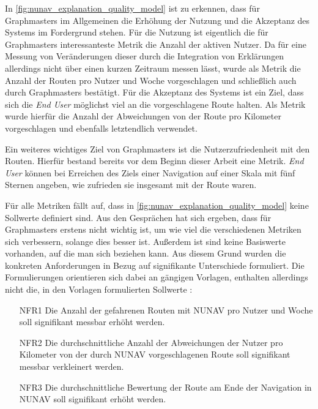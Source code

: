 In \autoref{fig:nunav_explanation_quality_model} ist zu erkennen, dass für Graphmasters im Allgemeinen die Erhöhung der Nutzung und die Akzeptanz des Systems im Fordergrund stehen. Für die Nutzung ist eigentlich die für Graphmasters interessanteste Metrik die Anzahl der aktiven Nutzer. Da für eine Messung von Veränderungen dieser durch die Integration von Erklärungen allerdings nicht über einen kurzen Zeitraum messen lässt, wurde  als Metrik die Anzahl der Routen pro Nutzer und Woche vorgeschlagen und schließlich auch durch Graphmasters bestätigt. Für die Akzeptanz des Systems ist ein Ziel, dass sich die \textit{End User} möglichst viel an die vorgeschlagene Route halten. Als Metrik wurde hierfür die Anzahl der Abweichungen von der Route pro Kilometer vorgeschlagen und ebenfalls letztendlich verwendet.

Ein weiteres wichtiges Ziel von Graphmasters ist die Nutzerzufriedenheit mit den Routen. Hierfür bestand bereits vor dem Beginn dieser Arbeit eine Metrik. \textit{End User} können bei Erreichen des Ziels einer Navigation auf einer Skala mit fünf Sternen angeben, wie zufrieden sie insgesamt mit der Route waren.

Für alle Metriken fällt auf, dass in \autoref{fig:nunav_explanation_quality_model} keine Sollwerte definiert sind. Aus den Gesprächen hat sich ergeben, dass für Graphmasters erstens nicht wichtig ist, um wie viel die verschiedenen Metriken sich verbessern, solange dies besser ist. Außerdem ist sind keine Basiswerte vorhanden, auf die man sich beziehen kann. Aus diesem Grund wurden die konkreten Anforderungen in Bezug auf signifikante Unterschiede formuliert. Die Formulierungen orientieren sich dabei an gängigen Vorlagen, enthalten allerdings nicht die, in den Vorlagen formulierten Sollwerte \cite{rajnish2010quality, wiegers1999writing, alexander2002writing}:

\begin{enumerate}
    \item [NFR1] Die Anzahl der gefahrenen Routen mit NUNAV pro Nutzer und Woche soll signifikant messbar erhöht werden.
    \item [NFR2] Die durchschnittliche Anzahl der Abweichungen der Nutzer pro Kilometer von der durch NUNAV vorgeschlagenen Route soll signifikant messbar verkleinert werden.
    \item [NFR3] Die durchschnittliche Bewertung der Route am Ende der Navigation in NUNAV soll signifikant erhöht werden.
\end{enumerate}

